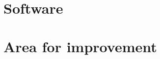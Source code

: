 \documentclass[
10pt, %
a4paper, %
oneside, %
headinclude,footinclude, %
BCOR5mm, %
]{scrartcl}
\begin{document}
\section{Software} %






\newpage



%
%


\section{Area for improvement} %

\newpage
\renewcommand{\refname}{\spacedlowsmallcaps{References}} %




\end{document}
